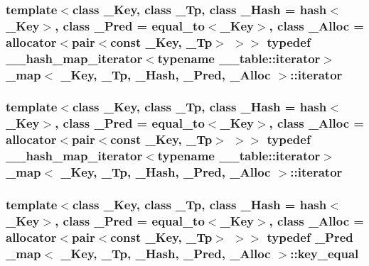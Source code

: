 \subsubsection[{iterator}]{\setlength{\rightskip}{0pt plus 5cm}template$<$class \+\_\+\+Key, class \+\_\+\+Tp, class \+\_\+\+Hash = hash$<$\+\_\+\+Key$>$, class \+\_\+\+Pred = equal\+\_\+to$<$\+\_\+\+Key$>$, class \+\_\+\+Alloc = allocator$<$pair$<$const \+\_\+\+Key, \+\_\+\+Tp$>$ $>$$>$ typedef {\bf \+\_\+\+\_\+hash\+\_\+map\+\_\+iterator}$<$typename \+\_\+\+\_\+table\+::iterator$>$ {\bf \+\_\+map}$<$ \+\_\+\+Key, \+\_\+\+Tp, \+\_\+\+Hash, \+\_\+\+Pred, \+\_\+\+Alloc $>$\+::{\bf iterator}}\label{class__map_a9ed817d33532f34fc46649b3fbe8e612}
\hypertarget{class__map_a9ed817d33532f34fc46649b3fbe8e612}{}
\subsubsection[{iterator}]{\setlength{\rightskip}{0pt plus 5cm}template$<$class \+\_\+\+Key, class \+\_\+\+Tp, class \+\_\+\+Hash = hash$<$\+\_\+\+Key$>$, class \+\_\+\+Pred = equal\+\_\+to$<$\+\_\+\+Key$>$, class \+\_\+\+Alloc = allocator$<$pair$<$const \+\_\+\+Key, \+\_\+\+Tp$>$ $>$$>$ typedef {\bf \+\_\+\+\_\+hash\+\_\+map\+\_\+iterator}$<$typename \+\_\+\+\_\+table\+::iterator$>$ {\bf \+\_\+map}$<$ \+\_\+\+Key, \+\_\+\+Tp, \+\_\+\+Hash, \+\_\+\+Pred, \+\_\+\+Alloc $>$\+::{\bf iterator}}\label{class__map_a9ed817d33532f34fc46649b3fbe8e612}
\hypertarget{class__map_ac341e21272b7041e034855227f1cce49}{}
\subsubsection[{key\+\_\+equal}]{\setlength{\rightskip}{0pt plus 5cm}template$<$class \+\_\+\+Key, class \+\_\+\+Tp, class \+\_\+\+Hash = hash$<$\+\_\+\+Key$>$, class \+\_\+\+Pred = equal\+\_\+to$<$\+\_\+\+Key$>$, class \+\_\+\+Alloc = allocator$<$pair$<$const \+\_\+\+Key, \+\_\+\+Tp$>$ $>$$>$ typedef \+\_\+\+Pred {\bf \+\_\+map}$<$ \+\_\+\+Key, \+\_\+\+Tp, \+\_\+\+Hash, \+\_\+\+Pred, \+\_\+\+Alloc $>$\+::{\bf key\+\_\+equal}}\label{class__map_ac341e21272b7041e034855227f1cce49}
\hypertarget{class__map_ac341e21272b7041e034855227f1cce49}{}
